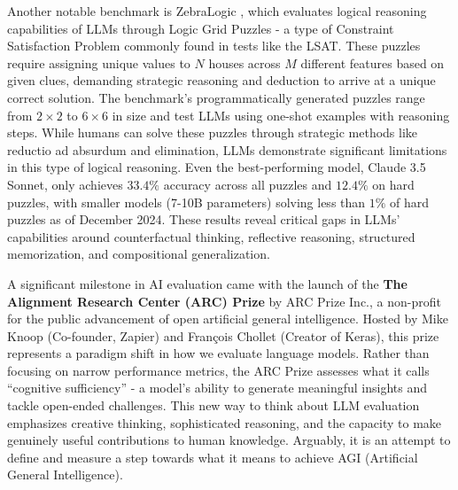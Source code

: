 Another notable benchmark is ZebraLogic , which evaluates logical reasoning capabilities of LLMs through Logic Grid Puzzles - a type of Constraint Satisfaction Problem  commonly found in tests like the LSAT. These puzzles require assigning unique values to $N$ houses across $M$ different features based on given clues, demanding strategic reasoning and deduction to arrive at a unique correct solution. The benchmark's programmatically generated puzzles range from $2\times2$ to $6\times6$ in size and test LLMs using one-shot examples with reasoning steps. While humans can solve these puzzles through strategic methods like reductio ad absurdum and elimination, LLMs demonstrate significant limitations in this type of logical reasoning. Even the best-performing model, Claude 3.5 Sonnet, only achieves $33.4\%$ accuracy across all puzzles and $12.4\%$ on hard puzzles, with smaller models (7-10B parameters) solving less than $1\%$ of hard puzzles as of December 2024. These results reveal critical gaps in LLMs' capabilities around counterfactual thinking, reflective reasoning, structured memorization, and compositional generalization.

A significant milestone in AI evaluation came with the launch of the \textbf{The Alignment Research Center (ARC) Prize}  by ARC Prize Inc., a non-profit for the public advancement of open artificial general intelligence. Hosted by Mike Knoop (Co-founder, Zapier) and François Chollet (Creator of Keras), this prize represents a paradigm shift in how we evaluate language models. Rather than focusing on narrow performance metrics, the ARC Prize assesses what it calls ``cognitive sufficiency'' - a model's ability to generate meaningful insights and tackle open-ended challenges. This new way to think about LLM evaluation emphasizes creative thinking, sophisticated reasoning, and the capacity to make genuinely useful contributions to human knowledge. Arguably, it is an attempt to define and measure a step towards what it means to achieve AGI (Artificial General Intelligence).

